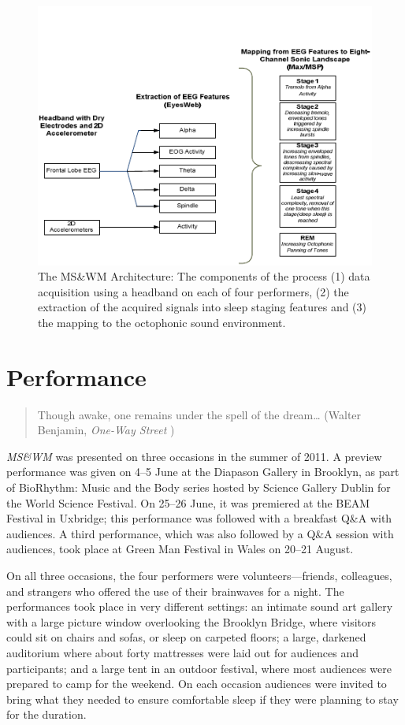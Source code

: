 \begin{figure}[t]
\centering
\includegraphics[width=\textwidth]{img-3-eps-converted-to-crop.pdf}
\caption{The MS\&WM Architecture:  The components of the process (1) data
acquisition using a headband on each of four performers, (2) the extraction of
the acquired signals into sleep staging features and (3) the mapping to the
octophonic sound environment.}
\label{Ouzounian:fig:2}
\end{figure}

\section{Performance}

\begin{quotation}
Though awake, one remains under the spell of the dream\ldots{} (Walter Benjamin, \textit{One-Way Street} \cite{Benjamin:1979})
\end{quotation}

\textit{MS\&WM }was presented on three occasions in the summer of 2011.  A
preview performance was given on 4--5 June at the Diapason Gallery in Brooklyn, as
part of BioRhythm: Music and the Body series hosted by Science Gallery Dublin for
the World Science Festival.  On 25--26 June, it was premiered at the BEAM Festival
in Uxbridge; this performance was followed with a breakfast Q\&A with audiences.
A third performance, which was also followed by a Q\&A session with audiences,
took place at Green Man Festival in Wales on 20--21 August.

On all three occasions, the four performers were volunteers---friends,
colleagues, and strangers who offered the use of their brainwaves for a night.
The performances took place in very different settings: an intimate sound art
gallery with a large picture window overlooking the Brooklyn Bridge, where
visitors could sit on chairs and sofas, or sleep on carpeted floors; a large,
darkened auditorium where about forty mattresses were laid out for audiences and
participants; and a large tent in an outdoor festival, where most audiences were
prepared to camp for the weekend. On each occasion audiences were invited to
bring what they needed to ensure comfortable sleep if they were planning to stay
for the duration.


